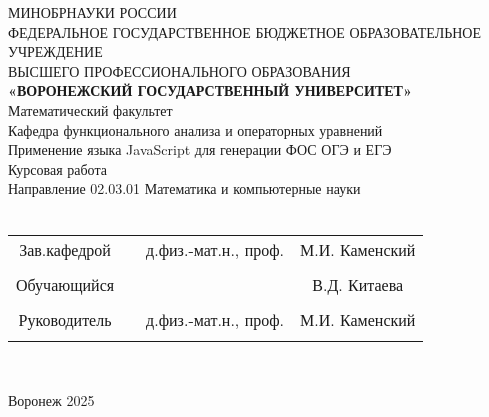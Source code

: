 
\begin{center}
	\hfill \break
	\large{МИНОБРНАУКИ РОССИИ}\\
	\footnotesize{ФЕДЕРАЛЬНОЕ ГОСУДАРСТВЕННОЕ БЮДЖЕТНОЕ ОБРАЗОВАТЕЛЬНОЕ УЧРЕЖДЕНИЕ}\\
	\footnotesize{ВЫСШЕГО ПРОФЕССИОНАЛЬНОГО ОБРАЗОВАНИЯ}\\
	\small{\textbf{«ВОРОНЕЖСКИЙ ГОСУДАРСТВЕННЫЙ УНИВЕРСИТЕТ»}}\\
	\hfill \break
	\normalsize{Математический факультет}\\
	\hfill \break
	\normalsize{Кафедра функционального анализа и операторных уравнений}\\
	\hfill\break
	\hfill \break
	\hfill \break
	\hfill \break
	\large{Применение языка JavaScript для генерации ФОС ОГЭ и ЕГЭ}\\
	\hfill \break
	\hfill \break
	\hfill \break
	\hfill \break
	\hfill \break
	\normalsize{Курсовая работа\\
		\hfill \break
		Направление 02.03.01 Математика и компьютерные науки\\

		\hfill \break
	}\\
	\hfill \break
	\hfill \break
\end{center}
\hfill \break

\normalsize{
	\begin{tabular}{cccc}
		Зав.кафедрой & \underline{\hspace{3cm}} & д.физ.-мат.н.,  проф. & М.И. Каменский    \\\\
		Обучающийся  & \underline{\hspace{3cm}} &                       & В.Д. Китаева \\\\
		Руководитель & \underline{\hspace{3cm}} & д.физ.-мат.н.,  проф. & М.И. Каменский    \\\\
	\end{tabular}
}\\
\hfill \break
\hfill \break
\begin{center} Воронеж 2025 \end{center}
\thispagestyle{empty} %

